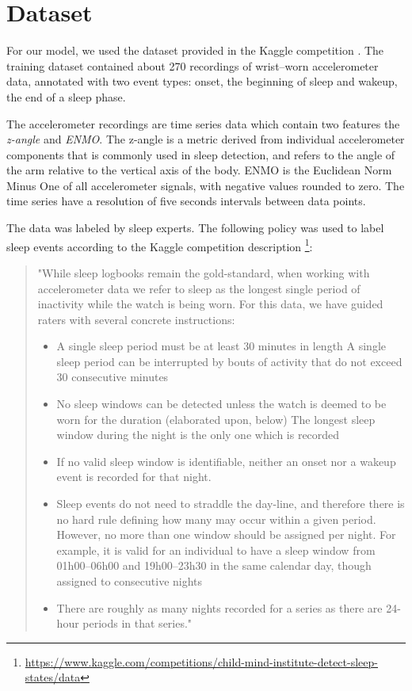 \documentclass{article}
\begin{document}
\section{Dataset}
\label{dataset}

For our model, we used the dataset provided in the Kaggle competition \cite{child-mind-institute-detect-sleep-states}. The training dataset contained about 270 recordings of wrist–worn accelerometer data, annotated with two event types: onset, the beginning of sleep and wakeup, the end of a sleep phase. 

The accelerometer recordings are time series data which contain two features the \textit{z-angle} and \textit{ENMO}. The z-angle is a metric derived from individual accelerometer components that is commonly used in sleep detection, and refers to the angle of the arm relative to the vertical axis of the body. ENMO is the Euclidean Norm Minus One of all accelerometer signals, with negative values rounded to zero. The time series have a resolution of five seconds intervals between data points.

The data was labeled by sleep experts. The following policy was used to label sleep events according to the Kaggle competition description \footnote{\url{https://www.kaggle.com/competitions/child-mind-institute-detect-sleep-states/data}}:

\begin{quote}
"While sleep logbooks remain the gold-standard, when working with accelerometer data we refer to sleep as the longest single period of inactivity while the watch is being worn. For this data, we have guided raters with several concrete instructions:
\begin{itemize}
  \item A single sleep period must be at least 30 minutes in length
    A single sleep period can be interrupted by bouts of activity that do not exceed 30 consecutive minutes
  \item No sleep windows can be detected unless the watch is deemed to be worn for the duration (elaborated upon, below)
The longest sleep window during the night is the only one which is recorded
  \item If no valid sleep window is identifiable, neither an onset nor a wakeup event is recorded for that night.
  \item Sleep events do not need to straddle the day-line, and therefore there is no hard rule defining how many may occur within a given period. However, no more than one window should be assigned per night. For example, it is valid for an individual to have a sleep window from 01h00–06h00 and 19h00–23h30 in the same calendar day, though assigned to consecutive nights
  \item There are roughly as many nights recorded for a series as there are 24-hour periods in that series."
\end{itemize}
\end{quote}
\end{document}
